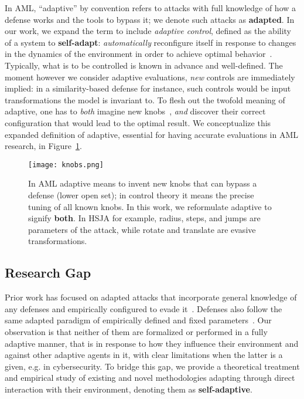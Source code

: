 In \gls{AML}, ``adaptive'' by convention refers to attacks with full knowledge of how a defense works and the tools to bypass it; we denote such attacks as \textbf{adapted}.
In our work, we expand the term to include \textit{adaptive control}, defined as the ability of a system to \textbf{self-adapt}: \emph{automatically} reconfigure itself in response to changes in the dynamics of the environment in order to achieve optimal behavior~\cite{aastrom2013adaptive}.
Typically, what is to be controlled is known in advance and well-defined.
The moment however we consider adaptive evaluations, \textit{new} controls are immediately implied: in a similarity-based defense for instance, such controls would be input transformations the model is invariant to.
To flesh out the twofold meaning of adaptive, one has to \textit{both} imagine new knobs~\cite{hofstadter2008metamagical}, \textit{and} discover their correct configuration that would lead to the optimal result.
We conceptualize this expanded definition of adaptive, essential for having accurate evaluations in \gls{AML} research, in Figure~\ref{fig:adaptivity}.

\begin{figure}
    \centering
    \texttt{[image: knobs.png]}
    \caption{In \gls{AML} adaptive means to invent new knobs that can bypass a defense (lower open set); in control theory it means the precise tuning of all known knobs. In this work, we reformulate adaptive to signify \textbf{both}. In HSJA for example, radius, steps, and jumps are parameters of the attack, while rotate and translate are evasive transformations.}
    \label{fig:adaptivity}
\end{figure}

\subsection{Research Gap}
Prior work has focused on adapted attacks that incorporate general knowledge of any defenses and empirically configured to evade it~\cite{carlini2017towards, chen2020hopskipjumpattack, brendel2018decision}.
Defenses also follow the same adapted paradigm of empirically defined and fixed parameters~\cite{chen2020stateful, li2022blacklight}.
Our observation is that neither of them are formalized or performed in a fully adaptive manner, that is in response to how they influence their environment and against other adaptive agents in it, with clear limitations when the latter is a given, e.g. in cybersecurity.
To bridge this gap, we provide a theoretical treatment and empirical study of existing and novel methodologies adapting through direct interaction with their environment, denoting them as \textbf{self-adaptive}.

